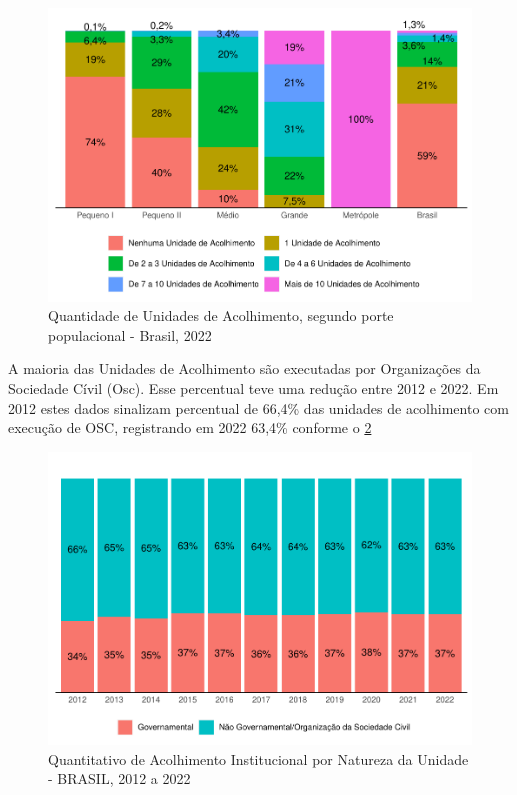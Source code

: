 \documentclass[
  brazilian]{report}
\begin{document}
\begin{figure}
\includegraphics{Censo-SUAS-2022_files/figure-latex/unac-porte-1} \caption[Quantidade de Unidades de Acolhimento, segundo porte populacional - Brasil, 2022]{Quantidade de Unidades de Acolhimento, segundo porte populacional - Brasil, 2022}\label{fig:unac-porte}
\end{figure}

A maioria das Unidades de Acolhimento são executadas por Organizações da
Sociedade Cívil (Osc). Esse percentual teve uma redução entre 2012 e
2022. Em 2012 estes dados sinalizam percentual de 66,4\% das unidades de
acolhimento com execução de OSC, registrando em 2022 63,4\% conforme o
\cref{fig:acolh_nat}

\begin{figure}
\includegraphics{Censo-SUAS-2022_files/figure-latex/acolh_nat-1} \caption[Quantitativo de Acolhimento Institucional por Natureza da Unidade - BRASIL, 2012 a 2022]{Quantitativo de Acolhimento Institucional por Natureza da Unidade - BRASIL, 2012 a 2022}\label{fig:acolh_nat}
\end{figure}
\end{document}
